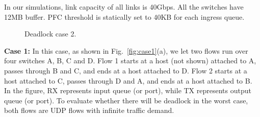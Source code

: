  In our simulations, link capacity of all links is 40Gbps. All the switches have 12MB buffer. PFC threshold is statically set to 40KB for each ingress queue.


\begin{figure}[t]
\centering



\caption{Deadlock case 2.}\label{fig:case2}

\end{figure}

\textbf{Case 1:} In this case, as shown in Fig.~\ref{fig:case1}(a), we let two flows run over four switches A, B, C and D. Flow 1 starts at a host (not shown) attached to A, passes through B and C, and ends at a host attached to D. Flow 2 starts at a host attached to C, passes through D and A, and ends at a host attached to B. In the figure, RX represents input queue (or port), while TX represents output queue (or port). To evaluate whether there will be deadlock in the worst case, both flows are UDP flows with infinite traffic demand.

